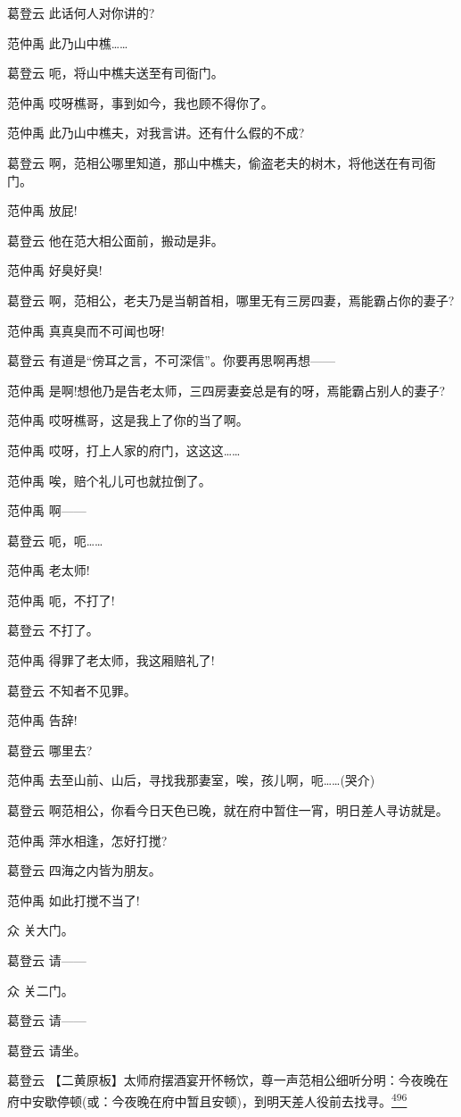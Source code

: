 葛登云 此话何人对你讲的?

范仲禹 此乃山中樵\ldots{}\ldots{}

葛登云 呃，将山中樵夫送至有司衙门。

范仲禹 哎呀樵哥，事到如今，我也顾不得你了。

范仲禹 此乃山中樵夫，对我言讲。还有什么假的不成?

葛登云
啊，范相公哪里知道，那山中樵夫，偷盗老夫的树木，将他送在有司衙门。

范仲禹 放屁!

葛登云 他在范大相公面前，搬动是非。

范仲禹 好臭好臭!

葛登云 啊，范相公，老夫乃是当朝首相，哪里无有三房四妻，焉能霸占你的妻子?

范仲禹 真真臭而不可闻也呀!

葛登云 有道是``傍耳之言，不可深信''。你要再思啊再想------

范仲禹 是啊!想他乃是告老太师，三四房妻妾总是有的呀，焉能霸占别人的妻子?

范仲禹 哎呀樵哥，这是我上了你的当了啊。

范仲禹 哎呀，打上人家的府门，这这这\ldots{}\ldots{}

范仲禹 唉，赔个礼儿可也就拉倒了。

范仲禹 啊------

葛登云 呃，呃\ldots{}\ldots{}

范仲禹 老太师!

范仲禹 呃，不打了!

葛登云 不打了。

范仲禹 得罪了老太师，我这厢赔礼了!

葛登云 不知者不见罪。

范仲禹 告辞!

葛登云 哪里去?

范仲禹
去至山前、山后，寻找我那妻室，唉，孩儿啊，呃\ldots{}\ldots{}(哭介)

葛登云 啊范相公，你看今日天色已晚，就在府中暂住一宵，明日差人寻访就是。

范仲禹 萍水相逢，怎好打搅?

葛登云 四海之内皆为朋友。

范仲禹 如此打搅不当了!

众 关大门。

葛登云 请------

众 关二门。

葛登云 请------

葛登云 请坐。

葛登云
【二黄原板】太师府摆酒宴开怀畅饮，尊一声范相公细听分明：今夜晚在府中安歇停顿(或：今夜晚在府中暂且安顿)，到明天差人役前去找寻。\protect\hyperlink{fn496}{\textsuperscript{496}}

